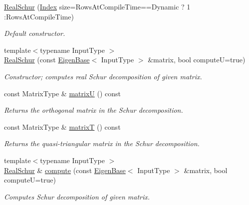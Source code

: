 \begin{DoxyCompactItemize}
\item 
\mbox{\hyperlink{class_eigen_1_1_real_schur_a826c83e2f1d4c8332606a14ea121ff5f}{Real\+Schur}} (\mbox{\hyperlink{class_eigen_1_1_real_schur_a8bd4653e2d9569a44ecc95e746422d3f}{Index}} size=Rows\+At\+Compile\+Time==Dynamic ? 1 \+:Rows\+At\+Compile\+Time)
\begin{DoxyCompactList}\small\item\em Default constructor. \end{DoxyCompactList}\item 
{\footnotesize template$<$typename Input\+Type $>$ }\\\mbox{\hyperlink{class_eigen_1_1_real_schur_afef4d3dc5a493aca2760c20b34337016}{Real\+Schur}} (const \mbox{\hyperlink{struct_eigen_1_1_eigen_base}{Eigen\+Base}}$<$ Input\+Type $>$ \&matrix, bool computeU=true)
\begin{DoxyCompactList}\small\item\em Constructor; computes real Schur decomposition of given matrix. \end{DoxyCompactList}\item 
const Matrix\+Type \& \mbox{\hyperlink{class_eigen_1_1_real_schur_a85622ccbecff99c8933d21f0a22b22bb}{matrixU}} () const
\begin{DoxyCompactList}\small\item\em Returns the orthogonal matrix in the Schur decomposition. \end{DoxyCompactList}\item 
const Matrix\+Type \& \mbox{\hyperlink{class_eigen_1_1_real_schur_abb78996b43b8642a5f507415730445cb}{matrixT}} () const
\begin{DoxyCompactList}\small\item\em Returns the quasi-\/triangular matrix in the Schur decomposition. \end{DoxyCompactList}\item 
{\footnotesize template$<$typename Input\+Type $>$ }\\\mbox{\hyperlink{class_eigen_1_1_real_schur}{Real\+Schur}} \& \mbox{\hyperlink{class_eigen_1_1_real_schur_a60caf9ffad11d728ea458c4dd36d0a98}{compute}} (const \mbox{\hyperlink{struct_eigen_1_1_eigen_base}{Eigen\+Base}}$<$ Input\+Type $>$ \&matrix, bool computeU=true)
\begin{DoxyCompactList}\small\item\em Computes Schur decomposition of given matrix. \end{DoxyCompactList}\item 

\end{DoxyCompactItemize}
